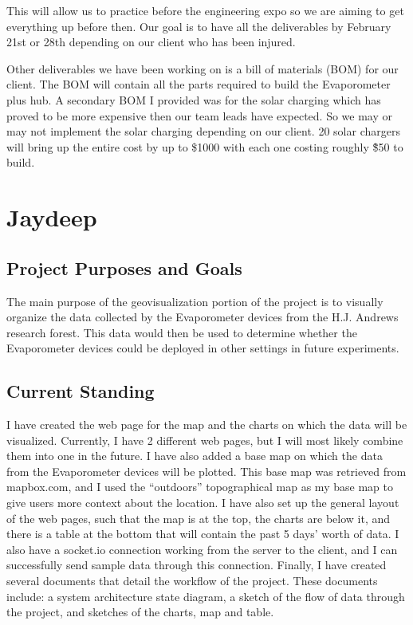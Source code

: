 \documentclass[onecolumn, draftclsnofoot,10pt, compsoc]{IEEEtran}
\begin{document}
This will allow us to practice before the engineering expo so we are aiming to get everything up before then.  Our goal is to have all the deliverables by February 21st or 28th depending on our client who has been injured. 

Other deliverables we have been working on is a bill of materials (BOM) for our client.  The BOM will contain all the parts required to build the Evaporometer plus hub.  A secondary BOM I provided was for the solar charging which has proved to be more expensive then our team leads have expected.  So we may or may not implement the solar charging depending on our client.  20 solar chargers will bring up the entire cost by up to \$1000 with each one costing roughly \~\$50 to build.

\section{Jaydeep}

\subsection{Project Purposes and Goals}
The main purpose of the geovisualization portion of the project is to visually organize the data collected by the Evaporometer devices from the H.J. Andrews research forest. This data would then be used to determine whether the Evaporometer devices could be deployed in other settings in future experiments.

\subsection{Current Standing}
I have created the web page for the map and the charts on which the data will be visualized. Currently, I have 2 different web pages, but I will most likely combine them into one in the future. I have also added a base map on which the data from the Evaporometer devices will be plotted. This base map was retrieved from mapbox.com, and I used the “outdoors” topographical map as my base map to give users more context about the location. I have also set up the general layout of the web pages, such that the map is at the top, the charts are below it, and there is a table at the bottom that will contain the past 5 days’ worth of data. I also have a socket.io connection working from the server to the client, and I can successfully send sample data through this connection. Finally, I have created several documents that detail the workflow of the project. These documents include: a system architecture state diagram, a sketch of the flow of data through the project, and sketches of the charts, map and table.
\end{document}
